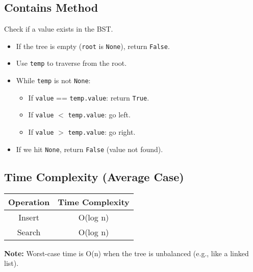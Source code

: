 \subsection*{Contains Method}
Check if a value exists in the BST.
\begin{itemize}
    \item If the tree is empty (\texttt{root} is \texttt{None}), return \texttt{False}.
    \item Use \texttt{temp} to traverse from the root.
    \item While \texttt{temp} is not \texttt{None}:
    \begin{itemize}
        \item If \texttt{value} == \texttt{temp.value}: return \texttt{True}.
        \item If \texttt{value} $<$ \texttt{temp.value}: go left.
        \item If \texttt{value} $>$ \texttt{temp.value}: go right.
    \end{itemize}
    \item If we hit \texttt{None}, return \texttt{False} (value not found).
\end{itemize}

\subsection{Time Complexity (Average Case)}

\begin{tabular}{|c|c|}
\hline
Operation & Time Complexity \\
\hline
Insert    & O(log n) \\
Search    & O(log n) \\
\hline
\end{tabular}

\textbf{Note:} Worst-case time is O(n) when the tree is unbalanced (e.g., like a linked list).

